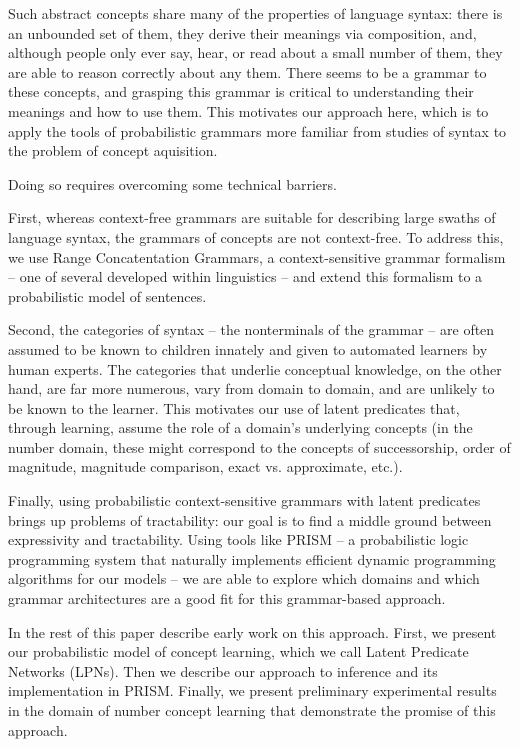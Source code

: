 \documentclass[11pt, twocolumn]{article}
\begin{document}
Such abstract concepts share many of the properties of language
syntax: there is an unbounded set of them, they derive their
meanings via composition, and, although people only ever say, hear, or
read about a small number of them, they are able to reason correctly
about any them. There seems to be a grammar to these concepts, and
grasping this grammar is critical to understanding their meanings and
how to use them. This motivates our approach here, which is to apply
the tools of probabilistic grammars more familiar from studies of
syntax to the problem of concept aquisition.

Doing so requires overcoming some technical barriers. 

First, whereas context-free grammars are suitable for describing large
swaths of language syntax, the grammars of concepts are not
context-free. To address this, we use Range Concatentation Grammars, a
context-sensitive grammar formalism -- one of several developed within
linguistics -- and extend this formalism to a probabilistic model of
sentences. 

Second, the categories of syntax -- the nonterminals of the grammar --
are often assumed to be known to children innately and given to
automated learners by human experts. The categories that underlie
conceptual knowledge, on the other hand, are far more numerous, vary
from domain to domain, and are unlikely to be known to the
learner. This motivates our use of latent predicates that, through
learning, assume the role of a domain's underlying concepts (in the
number domain, these might correspond to the concepts of
successorship, order of magnitude, magnitude comparison,
exact vs. approximate, etc.).

Finally, using probabilistic context-sensitive grammars with latent
predicates brings up problems of tractability: our goal is to find a
middle ground between expressivity and tractability. Using tools like
PRISM -- a probabilistic logic programming system that naturally
implements efficient dynamic programming algorithms for our models --
we are able to explore which domains and which grammar architectures
are a good fit for this grammar-based approach.

In the rest of this paper describe early work on this approach. First, we
present our probabilistic model of concept learning, which we call
Latent Predicate Networks (LPNs). Then  we describe our approach to
inference and its implementation in PRISM. Finally, we present
preliminary experimental results in the domain of number concept
learning that demonstrate the promise of this approach. 
\end{document}

